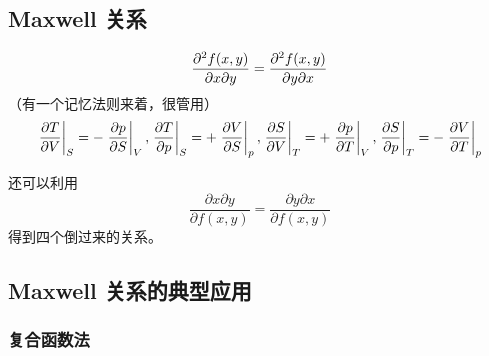 \subsection{Maxwell 关系}

\[
    \pdv{f(x, y)}{x}{y} = \pdv{f(x, y)}{y}{x}
\]（有一个记忆法则来着，很管用）\[
    \left.\pdv{T}{V}\right|_S = - \left.\pdv{p}{S}\right|_V, \left.\pdv{T}{p}\right|_S = + \left.\pdv{V}{S}\right|_p, \left.\pdv{S}{V}\right|_T = + \left.\pdv{p}{T}\right|_V, \left.\pdv{S}{p}\right|_T = - \left.\pdv{V}{T}\right|_p
\]

还可以利用\[
    \frac{\partial x \partial y}{\partial f(x, y)} = \frac{\partial y \partial x}{\partial f(x, y)}
\]得到四个倒过来的关系。

\subsection{Maxwell 关系的典型应用}

\subsubsection{复合函数法}

